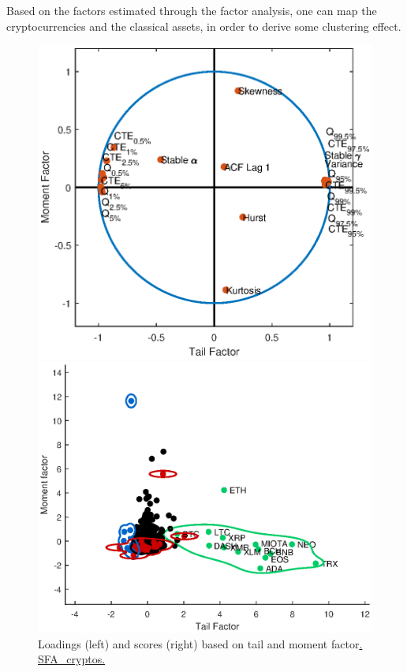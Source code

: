 Based on the factors estimated through the factor analysis, one can map the cryptocurrencies and the classical assets, in order to derive some clustering effect.

\begin{figure}[H]
	\begin{minipage}[b]{0.55\textwidth}
		\centering
		\includegraphics[width=1\textwidth]{Fig/figure_5a}


	\end{minipage}
	\begin{minipage}[b]{0.55\textwidth}
		\centering
		\includegraphics[width=1\textwidth]{Fig/figure_5b}

	\end{minipage}
\caption {Loadings (left) and scores (right) based on tail and moment factor\href{https://github.com/QuantLet/Genus_proximum_cryptos/tree/master/SFA_Cryptos}{. SFA\_cryptos.}}
\label{fig:figure_5}
\end{figure}



